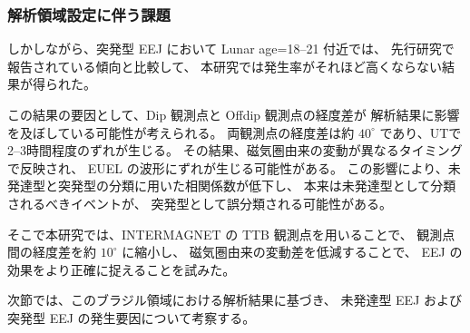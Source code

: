 \subsubsection{解析領域設定に伴う課題}
\label{sec:discussion_region_issues}

しかしながら、突発型 EEJ において Lunar age=18--21 付近では、
先行研究で報告されている傾向と比較して、
本研究では発生率がそれほど高くならない結果が得られた。

この結果の要因として、Dip 観測点と Offdip 観測点の経度差が
解析結果に影響を及ぼしている可能性が考えられる。
両観測点の経度差は約 $40^\circ$ であり、UTで2--3時間程度のずれが生じる。
その結果、磁気圏由来の変動が異なるタイミングで反映され、
EUEL の波形にずれが生じる可能性がある。
この影響により、未発達型と突発型の分類に用いた相関係数が低下し、
本来は未発達型として分類されるべきイベントが、
突発型として誤分類される可能性がある。


そこで本研究では、INTERMAGNET の TTB 観測点を用いることで、
観測点間の経度差を約 $10^\circ$ に縮小し、
磁気圏由来の変動差を低減することで、
EEJ の効果をより正確に捉えることを試みた。

次節では、このブラジル領域における解析結果に基づき、
未発達型 EEJ および突発型 EEJ の発生要因について考察する。